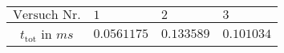 \begin{tabular}{c|*{3}{*{1}{l}}}
$\text{Versuch Nr.}$ & $1$ & $2$ & $3$ \\ \hline
$t_{\mathrm{tot}}$ in $\si{ms}$ & $0.0561175$ & $0.133589$ & $0.101034$\end{tabular}
